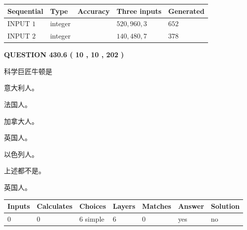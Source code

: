\documentclass{ctexart}
\begin{document}
   
  
  
\noindent\begin{tabular}{|l|l|l|l|l|}
\hline
 Sequential & Type & Accuracy & Three inputs & Generated \\ 
\hline
 
 
  INPUT $  1 $ & integer &  & $
 520
 , 
 960
 , 
 3
 $ & $ 652 $ 
 \\  \hline  
 
 
  INPUT $  2 $ & integer &  & $
 140
 , 
 480
 , 
 7
 $ & $ 378 $ 
 \\  \hline  
 \end{tabular}
   
   
  
\vspace{0.2in}
  
{\textbf{\Large{QUESTION
430.6 
 ( 10 , 10 , 202 )
}}}
  
  
科学巨匠牛顿是
 
 
意大利人。
 
 
法国人。
 
 
加拿大人。
 
 
英国人。
 
 
以色列人。
 
 
 上述都不是。
 
 
\noindent{}
 
 
英国人。
 
 
\noindent{}
 
 
   
   
   
   
\noindent\begin{tabular}{|l|l|l|l|l|l|l|}
 \hline
Inputs & Calculates & Choices & Layers & Matches & Answer & Solution \\ \hline
 0  & 
 0  & 
 6
  simple  
  & 
 6  & 
 0  & 
  yes & 
  no 
  \\ \hline
 \end{tabular}
   
   
   
   
\noindent{}
   
\end{document}
